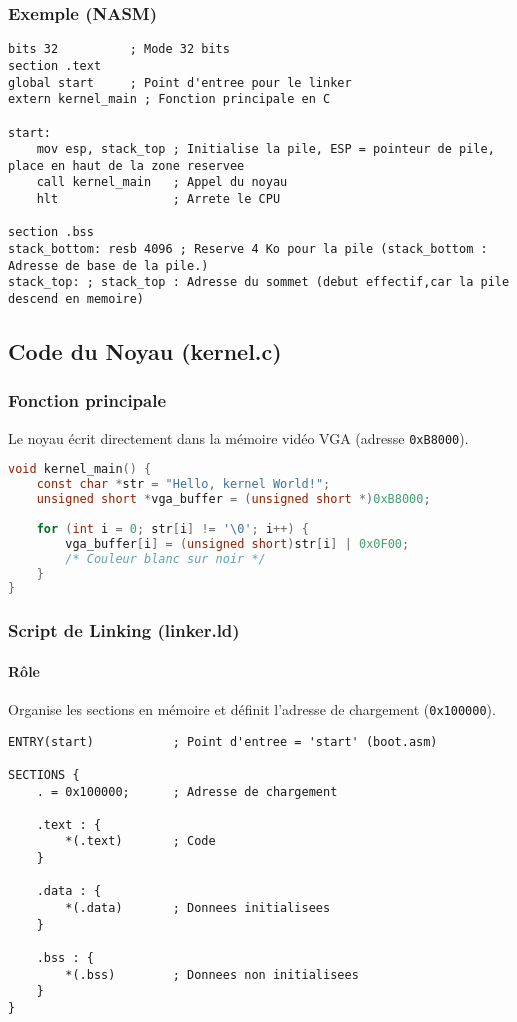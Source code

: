 \documentclass{article}
\begin{document}
\subsubsection*{Exemple (NASM)}
\begin{lstlisting}[language=assembler]
bits 32          ; Mode 32 bits
section .text
global start     ; Point d'entree pour le linker
extern kernel_main ; Fonction principale en C

start:
    mov esp, stack_top ; Initialise la pile, ESP = pointeur de pile, place en haut de la zone reservee
    call kernel_main   ; Appel du noyau
    hlt                ; Arrete le CPU

section .bss
stack_bottom: resb 4096 ; Reserve 4 Ko pour la pile (stack_bottom : Adresse de base de la pile.)
stack_top: ; stack_top : Adresse du sommet (debut effectif,car la pile descend en memoire)
\end{lstlisting}

\subsection*{Code du Noyau (kernel.c)}
\subsubsection*{Fonction principale}
Le noyau écrit directement dans la mémoire vidéo VGA (adresse \texttt{0xB8000}).

\begin{lstlisting}[language=C]
void kernel_main() {
    const char *str = "Hello, kernel World!";
    unsigned short *vga_buffer = (unsigned short *)0xB8000;
    
    for (int i = 0; str[i] != '\0'; i++) {
        vga_buffer[i] = (unsigned short)str[i] | 0x0F00; 
        /* Couleur blanc sur noir */
    }
}
\end{lstlisting}

\subsubsection*{Script de Linking (linker.ld)}
\paragraph{Rôle}
Organise les sections en mémoire et définit l'adresse de chargement (\texttt{0x100000}).

\begin{lstlisting}[language=ld]
ENTRY(start)           ; Point d'entree = 'start' (boot.asm)

SECTIONS {
    . = 0x100000;      ; Adresse de chargement

    .text : {
        *(.text)       ; Code
    }

    .data : {
        *(.data)       ; Donnees initialisees
    }

    .bss : {
        *(.bss)        ; Donnees non initialisees
    }
}
\end{lstlisting}
\end{document}
